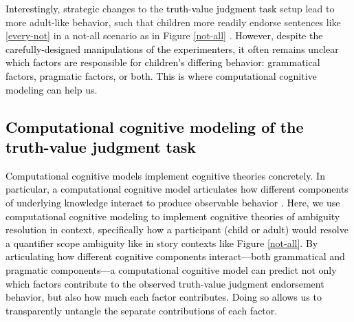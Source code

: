 \documentclass[cm]{glossa}
\newcommand{\lsp}[1]{\textcolor{red}{[lsp: #1]}}
\newcommand{\lp}[1]{\textcolor{black}{#1}} %
\begin{document}
\lp{Interestingly,} \lp{strategic} changes to the 
\lp{truth-value judgment task}
setup lead to more adult-like behavior, such that children more readily endorse sentences like \ref{every-not} in a not-all scenario as in Figure \ref{not-all} \citep{viauetal2010}. 
\lp{However, despite the carefully-designed manipulations of the experimenters, it often remains unclear which factors are responsible for children's differing behavior: grammatical factors, pragmatic factors, or both. This is where computational cognitive modeling can help us.}

\subsection{\lp{Computational cognitive modeling of the truth-value judgment task}}

\lp{Computational cognitive models implement cognitive theories concretely. In particular, a computational cognitive model articulates how different components of underlying knowledge interact to produce observable behavior \citep[e.g.,][]{pearlsprouse2013,goodmanfrank2016,pearlmis2016,pearl2017,pearletal2017,pearl2018chapter, pearlsprouse2018linking, scontrasetalproblang}.
Here, we use computational cognitive modeling to implement cognitive theories of ambiguity resolution in context, specifically how a participant (child or adult) would resolve a quantifier scope ambiguity like \Last in story contexts like Figure \ref{not-all}.
By articulating how different cognitive components interact---both grammatical and pragmatic components---a computational cognitive model can predict not only which factors contribute to the observed truth-value judgment endorsement behavior, but also how much each factor contributes.
Doing so allows us to transparently untangle the separate contributions of each factor.}
\end{document}

